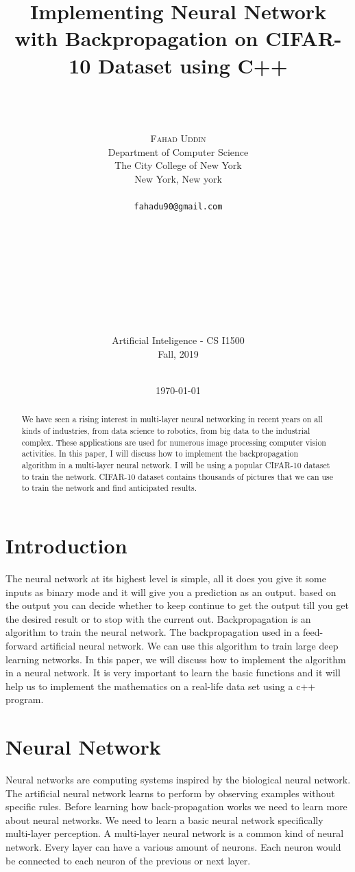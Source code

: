 \documentclass[12pt]{article}
\title{Implementing Neural Network with Backpropagation on CIFAR-10 Dataset using C++}
\author{
	\mbox{}\\ %
	\\
	\\
	\textsc{Fahad Uddin}
	\qquad
	\mbox{}\\ %
	Department of Computer Science\\
	The City College of New York\\
	New York, New york\\
	\\
	\texttt{fahadu90@gmail.com}
	\\
	\\
	\\
	\\
	\\
	\\
	\\
	\\
	\\
	\mbox{}\\ %
	Artificial Inteligence - CS I1500\\
	Fall, 2019\\
	\\
	\normalsize
	\normalsize
}
\date{\today}
\begin{document}
\maketitle
{}                   %
\setcounter{page}{0}                    %

\pagebreak

\begin{abstract}{
We have seen a rising interest in multi-layer neural networking in recent years on all kinds of industries, from data science to robotics, from big data to the industrial complex. These applications are used for numerous image processing computer vision activities. In this paper, I will discuss how to implement the backpropagation algorithm in a multi-layer neural network. I will be using a popular CIFAR-10 dataset to train the network. CIFAR-10 dataset contains thousands of pictures that we can use to train the network and find anticipated results.
}
\end{abstract}
\pagebreak

\tableofcontents

\pagebreak


\section{Introduction}

The neural network at its highest level is simple, all it does you give it some inputs as binary mode and it will give you a prediction as an output. based on the output you can decide whether to keep continue to get the output till you get the desired result or to stop with the current out. Backpropagation is an algorithm to train the neural network. The backpropagation used in a feed-forward artificial neural network. We can use this algorithm to train large deep learning networks. In this paper, we will discuss how to implement the algorithm in a neural network. It is very important to learn the basic functions and it will help us to implement the mathematics on a real-life data set using a c++ program.

\section{Neural Network}

Neural networks are computing systems inspired by the biological neural network. The artificial neural network learns to perform by observing examples without specific rules. Before learning how back-propagation works we need to learn more about neural networks. We need to learn a basic neural network specifically multi-layer perception. A multi-layer neural network is a common kind of neural network. Every layer can have a various amount of neurons. Each neuron would be connected to each neuron of the previous or next layer.
\end{document}
